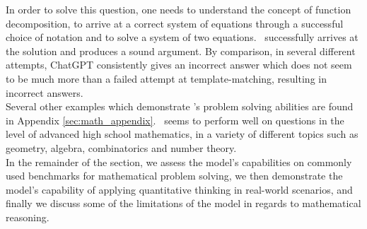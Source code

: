 
In order to solve this question, one needs to understand the concept of function decomposition, to arrive at a correct system of equations through a successful choice of notation and to solve a system of two equations. \DV \ successfully arrives at the solution and produces a sound argument. By comparison, in several different attempts, ChatGPT consistently gives an incorrect answer which does not seem to be much more than a failed attempt at template-matching, resulting in incorrect answers. \\

Several other examples which demonstrate \DV's problem solving abilities are found in Appendix \ref{sec:math_appendix}. \DV \ seems to perform well on questions in the level of advanced high school mathematics, in a variety of different topics such as geometry, algebra, combinatorics and number theory. \\

\iffalse
In the following section, we investigate DV3's mathematical abilities in the following categories:
\begin{enumerate}
\item Solving standard Math problems: The ability of the model to solve a mathematical question. We select problems from the elementary school level, high school level, and more advanced level, and test how \DV \ solves the questions in each level. We argue that \DV \ is already capable of solving \textbf{high-school-level} math questions. 
\item Quantitative reasoning: The ability of the model to build models and use math to solve daily-life questions. We argue that \DV \ is capable of building mathematical models for real-world scenarios, making reasonable assumptions to fill in the missing information.
\item Fundamental mathematical reasoning limitations of \DV.
\end{enumerate}
\fi
In the remainder of the section, we assess the model's capabilities on commonly used benchmarks for mathematical problem solving, we then demonstrate the model's capability of applying quantitative thinking in real-world scenarios, and finally we discuss some of the limitations of the model in regards to mathematical reasoning.

